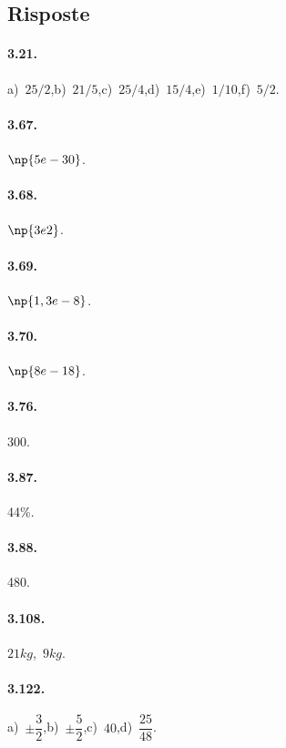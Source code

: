 \subsection{Risposte}
\begin{multicols}{2}
\paragraph{3.21.} a)~$25/2$,\quad b)~$21/5$,\quad c)~$25/4$,\quad d)~$15/4$,\quad e)~$1/10$,\quad f)~$5/2$.

\paragraph{3.67.}
$\np{5e-30}$.

\paragraph{3.68.}
$\np{3e2}$.

\paragraph{3.69.}
$\np{1,3e-8}$.

\paragraph{3.70.}
$\np{8e-18}$.

\paragraph{3.76.}
300.

\paragraph{3.87.}
44\%.

\paragraph{3.88.}
480.

\paragraph{3.108.}
$21\unit{kg}$,~$9\unit{kg}$.

\paragraph{3.122.}
a)~$\pm\dfrac{3}{2}$,\quad b)~$\pm\dfrac{5}{2}$,\quad c)~$40$,\quad d)~$\dfrac{25}{48}$.


\end{multicols}
